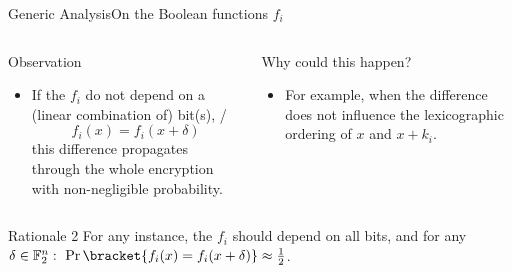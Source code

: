 \begin{frame}{Generic Analysis}{On the Boolean functions $f_i$}
    \begin{columns}
        \begin{column}{0.49\textwidth}
            \begin{block}{Observation\vpPp}
                \begin{itemize}
                    \item If the $f_i$ do not depend on a (linear combination of) bit(s), \ie/
                        \begin{equation*}
                            f_i(x) = f_i(x + \delta)
                        \end{equation*}
                        this difference propagates through the whole encryption with non-negligible probability.
                \end{itemize}
            \end{block}
        \end{column}
        \begin{column}{0.49\textwidth}
            \begin{block}{Why could this happen?}
                \begin{itemize}
                    \item For example, when the difference does not influence the lexicographic ordering of $x$ and $x + k_i$.
                \end{itemize}
                \vspace{56pt}
            \end{block}
        \end{column}
    \end{columns}
    \hspace*{-8.5pt}
    \begin{minipage}{1.0145\textwidth}
    \begin{exampleblock}{Rationale 2}
        For any instance, the $f_i$ should depend on all bits, and for any $\delta \in \F_2^n:\ \Pr\bracket{f_i(x) = f_i(x + \delta)} \approx \frac{1}{2}$.
    \end{exampleblock}
    \end{minipage}
\end{frame}

